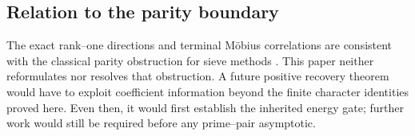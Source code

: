 \subsection{Relation to the parity boundary}

The exact rank--one directions and terminal M\"obius correlations are
consistent with the classical parity obstruction for sieve methods
\citep{HeathBrown1982Parity,IwaniecKowalski2004}.  This paper neither
reformulates nor resolves that obstruction.  A future positive recovery
theorem would have to exploit coefficient information beyond the finite
character identities proved here.  Even then, it would first establish the
inherited energy gate; further work would still be required before any
prime--pair asymptotic.

